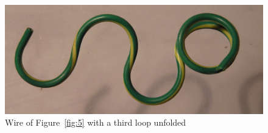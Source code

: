 %

\begin{figure}[!h]
  \centering
  \includegraphics[width=1.1\textwidth]{fig6.jpg}
  \caption{Wire of Figure~\ref{fig:5} with a third loop unfolded}
  \label{fig:6}
\end{figure}

%

